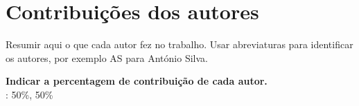 \documentclass{report}
\begin{document}
\chapter*{Contribuições dos autores}
Resumir aqui o que cada autor fez no trabalho.
Usar abreviaturas para identificar os autores,
por exemplo AS para António Silva.

\vspace{10pt}
\textbf{Indicar a percentagem de contribuição de cada autor.}\\


\autores : 50\%, 50\%\\




\printbibliography
\end{document}
